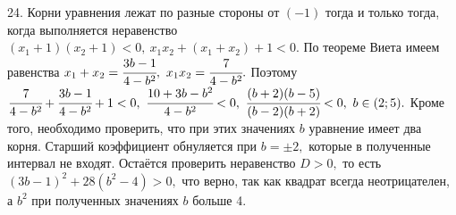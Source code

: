 24. Корни уравнения лежат по разные стороны от $(-1)$ тогда и только тогда, когда выполняется неравенство $(x_1+1)(x_2+1)<0,\ x_1x_2+(x_1+x_2)+1<0.$ По теореме Виета имеем равенства $x_1+x_2=\cfrac{3b-1}{4-b^2},\ x_1x_2=\cfrac{7}{4-b^2}.$ Поэтому $\cfrac{7}{4-b^2}+\cfrac{3b-1}{4-b^2}+1<0,\
\cfrac{10+3b-b^2}{4-b^2}<0,\ \cfrac{(b+2)(b-5)}{(b-2)(b+2)}<0,\ b\in(2;5).$ Кроме того, необходимо проверить, что при этих значениях $b$ уравнение имеет два корня. Старший коэффициент обнуляется при $b=\pm2,$ которые в полученные интервал не входят. Остаётся проверить неравенство $D>0,$ то есть $(3b-1)^2+28(b^2-4)>0,$ что верно, так как квадрат всегда неотрицателен, а $b^2$ при полученных значениях $b$ больше 4.\\
